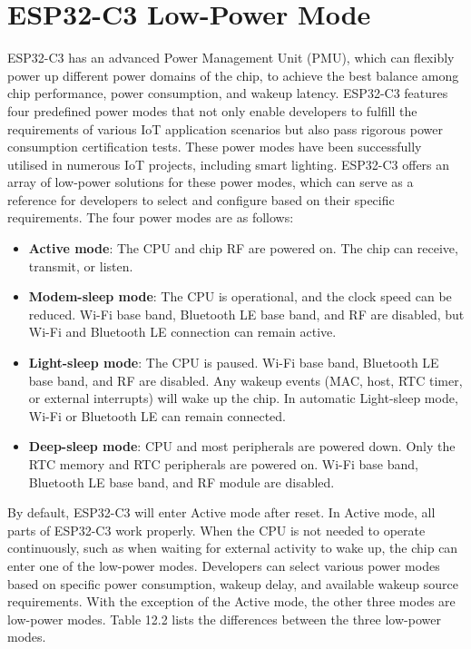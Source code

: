 \documentclass[a4paper,12pt]{book}
\begin{document}
\section{ESP32-C3 Low-Power Mode}
ESP32-C3 has an advanced Power Management Unit (PMU), which can flexibly power up different power domains of the chip, to achieve the best balance among chip performance, power consumption, and wakeup latency. ESP32-C3 features four predefined power modes that not only enable developers to fulfill the requirements of various IoT application scenarios but also pass rigorous power consumption certification tests. These power modes have been successfully utilised in numerous IoT projects, including smart lighting. ESP32-C3 offers an array of low-power solutions for these power modes, which can serve as a reference for developers to select and configure based on their specific requirements. The four power modes are as follows:

\begin{itemize}
    \item \textbf{Active mode}: The CPU and chip RF are powered on. The chip can receive, transmit, or listen.
    \item \textbf{Modem-sleep mode}: The CPU is operational, and the clock speed can be reduced. Wi-Fi base band, Bluetooth LE base band, and RF are disabled, but Wi-Fi and Bluetooth LE connection can remain active.
    \item \textbf{Light-sleep mode}: The CPU is paused. Wi-Fi base band, Bluetooth LE base band, and RF are disabled. Any wakeup events (MAC, host, RTC timer, or external interrupts) will wake up the chip. In automatic Light-sleep mode, Wi-Fi or Bluetooth LE can remain connected.
    \item \textbf{Deep-sleep mode}: CPU and most peripherals are powered down. Only the RTC memory and RTC peripherals are powered on. Wi-Fi base band, Bluetooth LE base band, and RF module are disabled.
\end{itemize}

By default, ESP32-C3 will enter Active mode after reset. In Active mode, all parts of ESP32-C3 work properly. When the CPU is not needed to operate continuously, such as when waiting for external activity to wake up, the chip can enter one of the low-power modes. Developers can select various power modes based on specific power consumption, wakeup delay, and available wakeup source requirements. With the exception of the Active mode, the other three modes are low-power modes. Table 12.2 lists the differences between the three low-power modes.
\end{document}
